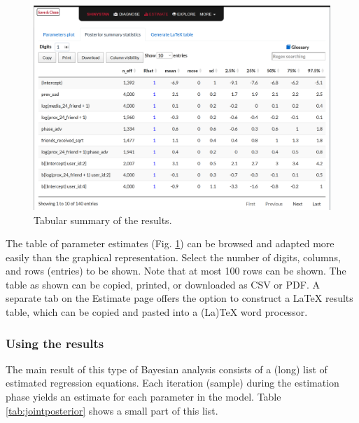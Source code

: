 \documentclass[doc]{apa6}
\begin{document}
\begin{figure}[H]
\includegraphics[width=1\linewidth]{shinystan6} \caption{Tabular summary of the results.}\label{fig:shinystanshot6}
\end{figure}

The table of parameter estimates (Fig. \ref{fig:shinystanshot6}) can be
browsed and adapted more easily than the graphical representation.
Select the number of digits, columns, and rows (entries) to be shown.
Note that at most 100 rows can be shown. The table as shown can be
copied, printed, or downloaded as CSV or PDF. A separate tab on the
Estimate page offers the option to construct a LaTeX results table,
which can be copied and pasted into a (La)TeX word processor.

\subsubsection{Using the results}\label{using-the-results}

The main result of this type of Bayesian analysis consists of a (long)
list of estimated regression equations. Each iteration (sample) during
the estimation phase yields an estimate for each parameter in the model.
Table \ref{tab:jointposterior} shows a small part of this list.
\end{document}
